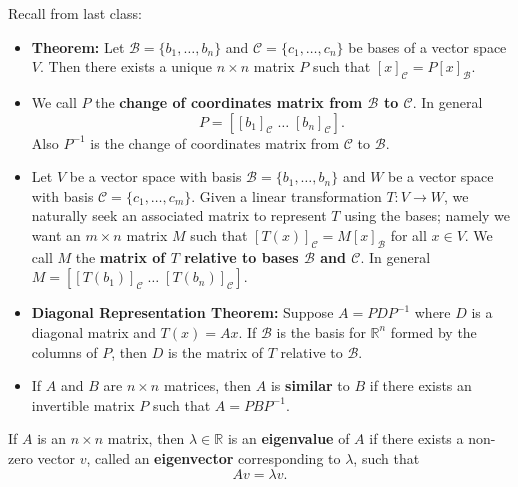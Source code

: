 \documentclass[12pt,letterpaper]{article}
\begin{document}
\thispagestyle{fancy}

Recall from last class:

\begin{itemize}
\item {\bf Theorem:} Let $\mathcal{B}=\{b_1, \dots, b_n\}$ and $\mathcal{C}=\{c_1, \dots, c_n\}$ be bases of a vector space $V$. Then there exists a unique $n\times n$ matrix $P$ such that $[x]_{\mathcal{C}}=P [x]_{\mathcal{B}}$.
\item We call $P$ the {\bf change of coordinates matrix from $\mathcal{B}$ to $\mathcal{C}$}. In general $$P= [[b_1]_\mathcal{C} \; \dots \; [b_n]_\mathcal{C}].$$ Also $P^{-1}$ is the change of coordinates matrix from $\mathcal{C}$ to $\mathcal{B}$.
\item Let $V$ be a vector space with basis $\mathcal{B}=\{b_1, \dots, b_n\}$ and $W$ be a vector space with basis $\mathcal{C}=\{c_1, \dots, c_m\}$. Given a linear transformation $T: V\to W$, we naturally seek an associated matrix to represent $T$ using the bases; namely we want an $m\times n$ matrix $M$ such that $[T(x)]_\mathcal{C}=M [x]_\mathcal{B}$ for all $x \in V$. We call $M$ the {\bf matrix of $T$ relative to bases $\mathcal{B}$ and $\mathcal{C}$}. In general $M= [[T(b_1)]_\mathcal{C} \; \dots \; [T(b_n)]_\mathcal{C}]$.
\item {\bf Diagonal Representation Theorem:} Suppose $A= P D P^{-1}$ where $D$ is a diagonal matrix and $T(x)=Ax$. If $\mathcal{B}$ is the basis for $\mathbb{R}^n$ formed by the columns of $P$, then $D$ is the matrix of $T$ relative to $\mathcal{B}$. 
\item If $A$ and $B$ are $n\times n$ matrices, then $A$ is {\bf similar} to $B$ if there exists an invertible matrix $P$ such that $A=PB P^{-1}$.
\end{itemize}

\newpage

\begin{defn}
If $A$ is an $n \times n$ matrix, then $\lambda \in \mathbb{R}$ is an {\bf eigenvalue} of $A$ if there exists a non-zero vector $v$, called an {\bf eigenvector} corresponding to $\lambda$, such that $$Av=\lambda v.$$
\end{defn}
\end{document}
